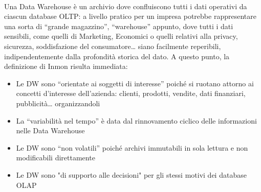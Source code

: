 \documentclass[a4paper,12pt]{report}
\begin{document}
\\[0ex]
Una Data Warehouse è un archivio dove confluiscono tutti i dati operativi da ciascun database OLTP: a livello pratico per un impresa potrebbe rappresentare una sorta di “grande magazzino”, “warehouse” appunto, dove tutti i dati sensibili, come quelli di Marketing, Economici o quelli relativi alla privacy, sicurezza, soddisfazione del consumatore… siano facilmente reperibili, indipendentemente dalla profondità storica del dato.
A questo punto, la definizione di Inmon risulta immediata:
\begin{itemize}
    \item Le DW sono “orientate ai soggetti di interesse” poiché si ruotano attorno ai concetti d’interesse dell’azienda: clienti, prodotti, vendite, dati finanziari, pubblicità… organizzandoli
    \item La “variabilità nel tempo” è data dal rinnovamento ciclico delle informazioni nelle Data Warehouse
    \item Le DW sono “non volatili” poiché archivi immutabili in sola lettura e non modificabili direttamente
    \item Le DW sono "di supporto alle decisioni" per gli stessi motivi dei database OLAP
\end{itemize}
\end{document}
